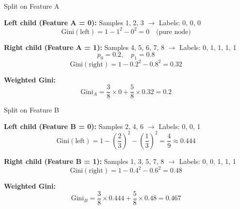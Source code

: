\documentclass[aspectratio=169]{beamer}
\begin{document}
\begin{frame}{Split on Feature A}

\textbf{Left child (Feature A = 0):} Samples 1, 2, 3 $\rightarrow$ Labels: 0, 0, 0
\[
\text{Gini}(\text{left}) = 1 - 1^2 - 0^2 = 0 \quad \text{(pure node)}
\]

\pause
\vspace{0.5em}

\textbf{Right child (Feature A = 1):} Samples 4, 5, 6, 7, 8 $\rightarrow$ Labels: 0, 1, 1, 1, 1
\[
p_0 = 0.2, \quad p_1 = 0.8
\]
\[
\text{Gini}(\text{right}) = 1 - 0.2^2 - 0.8^2 = 0.32
\]

\pause
\vspace{0.5em}

\textbf{Weighted Gini:}
\[
\text{Gini}_A = \frac{3}{8} \times 0 + \frac{5}{8} \times 0.32 = 0.2
\]

\end{frame}

\begin{frame}{Split on Feature B}

\textbf{Left child (Feature B = 0):} Samples 2, 4, 6 $\rightarrow$ Labels: 0, 0, 1
\[
\text{Gini}(\text{left}) = 1 - \left(\frac{2}{3}\right)^2 - \left(\frac{1}{3}\right)^2 = \frac{4}{9} \approx 0.444
\]

\pause
\vspace{0.5em}

\textbf{Right child (Feature B = 1):} Samples 1, 3, 5, 7, 8 $\rightarrow$ Labels: 0, 0, 1, 1, 1
\[
\text{Gini}(\text{right}) = 1 - 0.4^2 - 0.6^2 = 0.48
\]

\pause
\vspace{0.5em}

\textbf{Weighted Gini:}
\[
\text{Gini}_B = \frac{3}{8} \times 0.444 + \frac{5}{8} \times 0.48 = 0.467
\]

\end{frame}
\end{document}
